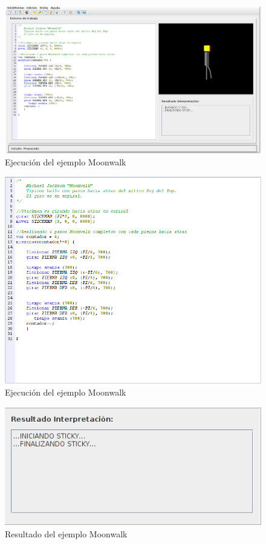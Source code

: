 \documentclass[a4paper, 12pt]{book}
\begin{document}
\begin{itemize}
  \begin{figure}[htb]
    \centerline{\includegraphics[width=\textwidth]{./imagenes/moonwalk.png}}
    \caption{Ejecución del ejemplo Moonwalk}
  \end{figure}
  

  \begin{figure}[htb]
    \centerline{\includegraphics[width=\textwidth]{./imagenes/moonwalk-codigo.png}}
    \caption{Ejecución del ejemplo Moonwalk}
  \end{figure}
  
  
  
\begin{figure}[htb]
  \centerline{\includegraphics[width=\textwidth]{./imagenes/moonwalk-resultado.png}}
  \caption{Resultado del ejemplo Moonwalk}
\end{figure}




\end{itemize}
\end{document}
